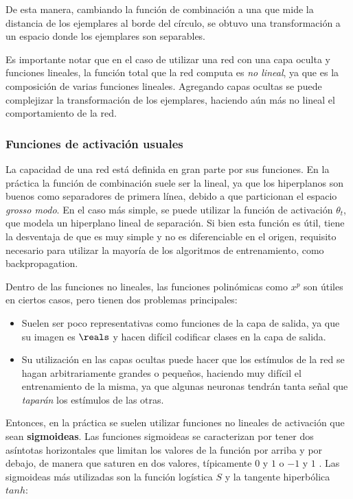 
De esta manera, cambiando la función de combinación a una que mide la distancia de los ejemplares al borde del círculo, se obtuvo una transformación a un espacio donde los ejemplares son separables.

Es importante notar que en el caso de utilizar una red con una capa oculta y funciones lineales, la función total que la red computa es \textit{no lineal}, ya que es la composición de varias funciones lineales. Agregando capas ocultas se puede complejizar la transformación de los ejemplares, haciendo aún más no lineal el comportamiento de la red. 

\subsubsection{Funciones de activación usuales}

La capacidad de una red está definida en gran parte por sus funciones. En la práctica la función de combinación suele ser la lineal, ya que los hiperplanos son buenos como separadores de primera línea, debido a que particionan el espacio \textit{grosso modo}. En el caso más simple, se puede utilizar la función de activación $\theta_t$, que modela un hiperplano lineal de separación. Si bien esta función es útil, tiene la desventaja de que es muy simple y no es diferenciable en el origen, requisito necesario para utilizar la mayoría de los algoritmos de entrenamiento, como backpropagation.

Dentro de las funciones no lineales, las funciones polinómicas como $x^p$ son útiles en ciertos casos, pero tienen dos problemas principales:

\begin{itemize}
\item Suelen ser poco representativas como funciones de la capa de salida, ya que su imagen es $\reals$ y hacen difícil codificar clases en la capa de salida.
\item Su utilización en las capas ocultas puede hacer que los estímulos de la red se hagan arbitrariamente grandes o pequeños, haciendo muy difícil el entrenamiento de la misma, ya que algunas neuronas tendrán tanta señal que \textit{taparán} los estímulos de las otras.
\end{itemize} 

Entonces, en la práctica se suelen utilizar funciones no lineales de activación que sean \textbf{sigmoideas}. Las funciones sigmoideas se caracterizan por tener dos asíntotas horizontales que limitan los valores de la función por arriba y por debajo, de manera que saturen en dos valores, típicamente $0$ y $1$ o $-1$ y $1$ \cite{lecun1998}. Las sigmoideas más utilizadas son la función logística $S$ y la tangente hiperbólica $tanh$:

